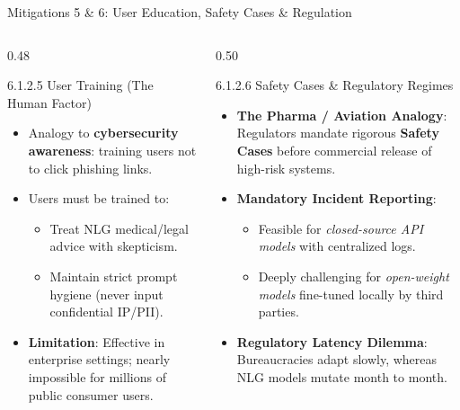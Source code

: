 \documentclass[aspectratio=169, 10pt]{beamer}
\begin{document}
\begin{frame}{Mitigations 5 \& 6: User Education, Safety Cases \& Regulation}
  \begin{columns}[T]
    \begin{column}{0.48\textwidth}
      \begin{block}{6.1.2.5 User Training (The Human Factor)}
        \begin{itemize}
          \item Analogy to \textbf{cybersecurity awareness}: training users not to click phishing links.
          \item Users must be trained to:
          \begin{itemize}
            \item Treat NLG medical/legal advice with skepticism.
            \item Maintain strict prompt hygiene (never input confidential IP/PII).
          \end{itemize}
          \item \textbf{Limitation}: Effective in enterprise settings; nearly impossible for millions of public consumer users.
        \end{itemize}
      \end{block}
    \end{column}

    \begin{column}{0.50\textwidth}
      \begin{block}{6.1.2.6 Safety Cases \& Regulatory Regimes}
        \begin{itemize}
          \item \textbf{The Pharma / Aviation Analogy}: Regulators mandate rigorous \textbf{Safety Cases} before commercial release of high-risk systems.
          \item \textbf{Mandatory Incident Reporting}:
          \begin{itemize}
            \item Feasible for \textit{closed-source API models} with centralized logs.
            \item Deeply challenging for \textit{open-weight models} fine-tuned locally by third parties.
          \end{itemize}
          \item \textbf{Regulatory Latency Dilemma}: Bureaucracies adapt slowly, whereas NLG models mutate month to month.
        \end{itemize}
      \end{block}
    \end{column}
  \end{columns}
\end{frame}
\end{document}
